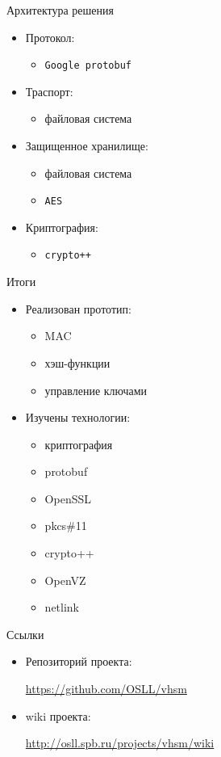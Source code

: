 \documentclass[utf8, 11pt]{beamer}
\begin{document}
\begin{frame}{Архитектура решения}
\begin{itemize}
\item Протокол:
	\begin{itemize}
	\item \texttt{Google protobuf}
	\end{itemize}
\item Траспорт:
	\begin{itemize}
	\item файловая система
	\end{itemize}
\item Защищенное хранилище:
	\begin{itemize}
	\item файловая система
	\item \texttt{AES}
	\end{itemize}
\item Криптография:
	\begin{itemize}
	\item \texttt{crypto++}
	\end{itemize}
\end{itemize}

\vspace*{\fill}
	
\end{frame}

\begin{frame}{Итоги}
\begin{itemize}
\item Реализован прототип:
	\begin{itemize}
		\item MAC
		\item хэш-функции
		\item управление ключами
	\end{itemize}
	
\item Изучены технологии:
	\begin{itemize}
		\item криптография
		\item protobuf
		\item OpenSSL
		\item pkcs\#11
		\item crypto++
		\item OpenVZ
		\item netlink
	\end{itemize}
	
\end{itemize}

\vspace*{\fill}

\end{frame}

\begin{frame}{Ссылки}
\begin{itemize}
\item Репозиторий проекта:

\url{https://github.com/OSLL/vhsm}

\item wiki проекта:

\url{http://osll.spb.ru/projects/vhsm/wiki}
\end{itemize}

\vspace*{\fill}

\end{frame}
\end{document}
